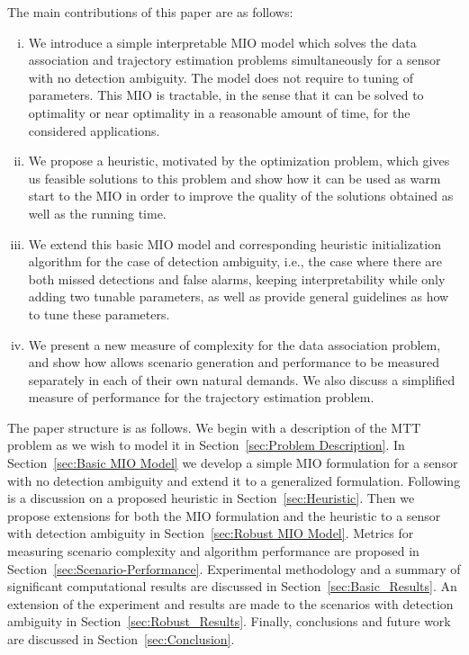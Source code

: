 \documentclass[journal]{IEEEtran}
\begin{document}
The main contributions of this paper are as follows: 
\begin{enumerate}[(i)]
\item We introduce a simple interpretable MIO model which solves the data association and trajectory estimation problems simultaneously for a sensor with no detection ambiguity. The model does not require to tuning of parameters. This MIO is tractable, in the sense that it can be solved to optimality or near optimality in a reasonable amount of time, for the considered applications.
\item We propose a heuristic, motivated by the optimization problem, which gives us feasible solutions to this problem and show how it can be used as warm start to the MIO in order to improve the quality of the solutions obtained as well as the running time. 
\item We extend this basic MIO model and corresponding heuristic initialization algorithm for the case of detection ambiguity, i.e., the case where there are both missed detections and false alarms, keeping interpretability while only adding two tunable parameters, as well as provide general guidelines as how to tune these parameters. 
\item  We present a new measure of complexity for the data association problem, and show how allows scenario generation and performance to be measured separately in each of their own natural demands. We also discuss a simplified measure of performance for the trajectory estimation problem. 
\end{enumerate}

The paper structure is as follows. We begin with a description of the MTT problem as we wish to model it in Section~\ref{sec:Problem Description}. In Section~\ref{sec:Basic MIO Model} we develop a simple MIO formulation for a sensor with no detection ambiguity and extend it to a generalized formulation. Following is a discussion on a proposed heuristic in Section~\ref{sec:Heuristic}. Then we propose extensions for both the MIO formulation and the heuristic to a sensor with detection ambiguity in Section~\ref{sec:Robust MIO Model}. Metrics for measuring scenario complexity and algorithm performance are proposed in Section~\ref{sec:Scenario-Performance}.  Experimental methodology and a summary of significant computational results are discussed in Section~\ref{sec:Basic_Results}. An extension of the experiment and results are made to the scenarios with detection ambiguity in Section~\ref{sec:Robust_Results}. Finally, conclusions and future work are discussed in Section~\ref{sec:Conclusion}.
\end{document}
